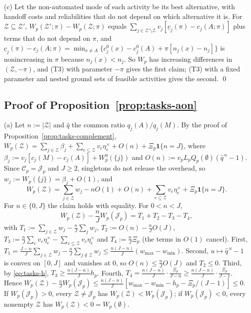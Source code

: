(c) Let the non-automated mode of each activity be its best alternative, with handoff costs and reliabilities that do not depend on which alternative it is. For $\mathcal Z\subseteq\mathcal Z'$, $W_p(\mathcal Z';\pi)-W_p(\mathcal Z;\pi)$ equals $\sum_{j\in\mathcal Z'\setminus\mathcal Z}v_j[\underline c_j(\pi)-c_j(A;\pi)]$ plus terms that do not depend on $\pi$, and $\underline c_j(\pi)-c_j(A;\pi)=\min_{x\ne A}\{c^0_j(x)-c^0_j(A)+\pi[n_j(x)-n_j]\}$ is nonincreasing in $\pi$ because $n_j(x)<n_j$. So $W_p$ has increasing differences in $(\mathcal Z,-\pi)$, and (T3) with parameter $-\pi$ gives the first claim; (T3) with a fixed parameter and nested ground sets of feasible activities gives the second. \qed

\subsection*{Proof of Proposition~\ref{prop:tasks-aon}}

(a) Let $n:=|\mathcal Z|$ and $\hat q$ the common ratio $q_j(A)/q_j(M)$. By the proof of Proposition~\ref{prop:tasks-complement}, $W_p(\mathcal Z)=\sum_{j\in\mathcal Z}\beta_j+\sum_{e\subseteq\mathcal Z}v_e\eta^\times_e+O(n)+\Xi_p\mathbf 1\{n=J\}$, where $\beta_j:=v_j[c_j(M)-c_j(A)]+W^\eta_p(\{j\})$ and $O(n):=v_pL_pQ_p(\emptyset)(\hat q^{\,n}-1)$. Since $\mathcal C_p=\mathcal J_p$ and $J\ge 2$, singletons do not release the overhead, so $w_j:=W_p(\{j\})=\beta_j+O(1)$, and
\[
W_p(\mathcal Z)=\sum_{j\in\mathcal Z}w_j-nO(1)+O(n)+\sum_{e\subseteq\mathcal Z}v_e\eta^\times_e+\Xi_p\mathbf 1\{n=J\}.
\]
For $n\in\{0,J\}$ the claim holds with equality. For $0<n<J$,
\[
W_p(\mathcal Z)-\frac nJW_p(\mathcal J_p)=T_1+T_2-T_3-T_4,
\]
with $T_1:=\sum_{j\in\mathcal Z}w_j-\frac nJ\sum_jw_j$, $T_2:=O(n)-\frac nJO(J)$, $T_3:=\frac nJ\sum_ev_e\eta^\times_e-\sum_{e\subseteq\mathcal Z}v_e\eta^\times_e$ and $T_4:=\frac nJ\Xi_p$ (the terms in $O(1)$ cancel). First, $T_1=\frac{J-n}J\sum_{j\in\mathcal Z}w_j-\frac nJ\sum_{j\notin\mathcal Z}w_j\le\frac{n(J-n)}J(w_{\max}-w_{\min})$. Second, $u\mapsto\hat q^{\,u}-1$ is convex on $[0,J]$ and vanishes at $0$, so $O(n)\le\frac nJO(J)$ and $T_2\le 0$. Third, by \eqref{eq:tasks-h}, $T_3\ge\frac{n(J-n)}Jh_p$. Fourth, $T_4=\frac{n(J-n)}J\cdot\frac{\Xi_p}{J-n}\ge\frac{n(J-n)}J\cdot\frac{\Xi_p}{J-1}$. Hence $W_p(\mathcal Z)-\frac nJW_p(\mathcal J_p)\le\frac{n(J-n)}J[w_{\max}-w_{\min}-h_p-\Xi_p/(J-1)]\le 0$. If $W_p(\mathcal J_p)>0$, every $\mathcal Z\ne\mathcal J_p$ has $W_p(\mathcal Z)<W_p(\mathcal J_p)$; if $W_p(\mathcal J_p)<0$, every nonempty $\mathcal Z$ has $W_p(\mathcal Z)<0=W_p(\emptyset)$.

